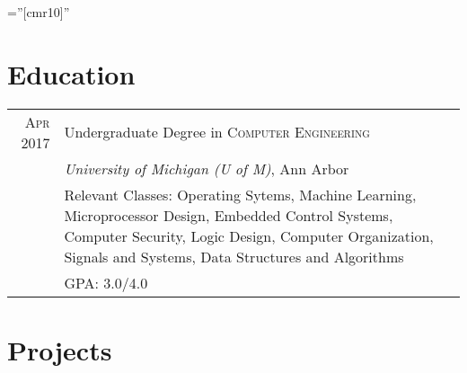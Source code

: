 \documentclass[a4paper,10pt]{article} %
\begin{document}
\pagestyle{empty} %

\font\fb=''[cmr10]'' %


\par{\bigskip\par} %

\par{ }


\section{Education}

\begin{tabular}{r|p{12cm}}
\textsc{Apr} 2017 \space\space & Undergraduate Degree in \textsc{Computer Engineering} \\
& \normalsize\emph{University of Michigan (U of M)}, Ann Arbor \\
& \footnotesize{Relevant Classes: Operating Sytems, Machine Learning,
  Microprocessor Design, Embedded Control Systems, Computer Security,
  Logic Design, Computer Organization, Signals and Systems,
  Data Structures and Algorithms}\\
& \footnotesize{GPA: 3.0/4.0} \\
\end{tabular}


\section{Projects}
\end{document}
